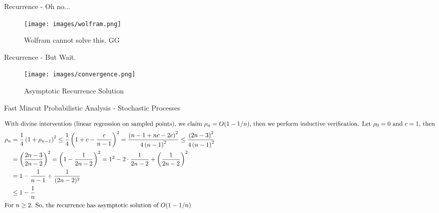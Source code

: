 \begin{frame}{Recurrence - Oh no...}
    \begin{figure}
        \centering
        \texttt{[image: images/wolfram.png]}
        \caption{Wolfram cannot solve this. GG}
        \label{fig:enter-label}
    \end{figure}
\end{frame}

\begin{frame}{Recurrence - But Wait.}
    \begin{figure}
        \centering
        \texttt{[image: images/convergence.png]}
        \caption{Asymptotic Recurrence Solution}
        \label{fig:enter-label}
    \end{figure}
\end{frame}

\begin{frame}{Fast Mincut Probabilistic Analysis - Stochastic Processes}
    \setlength{\abovedisplayskip}{0pt}
    \setlength{\belowdisplayskip}{0pt}
    \setlength{\abovedisplayshortskip}{0pt}
    \setlength{\belowdisplayshortskip}{0pt}
    \begin{proofs}
        \begin{align*}
            \intertext{With divine intervention (linear regression on sampled points), we claim $\rho_n = O(1 - 1/n)$, then we perform inductive verification. Let $\rho_0 = 0$ and $c = 1$, then}
            \rho_n &= \frac{1}{4}\left(1 + \rho_{n - 1}\right)^2 \leq \frac{1}{4}\left(1 + c - \frac{c}{n - 1}\right)^2 = \frac{\left(n-1+nc-2c\right)^2}{4\left(n-1\right)^2} \leq  \frac{\left(2n-3\right)^2}{4\left(n-1\right)^2}\\
            &= \left(\frac{2n-3}{2n-2}\right)^2 = \left(1 - \frac{1}{2n-2}\right)^2 = 1^2 - 2 \cdot \frac{1}{2n-2}+\left(\frac{1}{2n-2}\right)^2\\
            &= 1 - \frac{1}{n-1} + \frac{1}{(2n-2)^2}\\
            &\leq 1 - \frac{1}{n}\\
            \intertext{For $n \geq 2$. So, the recurrence has asymptotic solution of $O(1 - 1/n)$}
        \end{align*}
    \end{proofs}
\end{frame}

